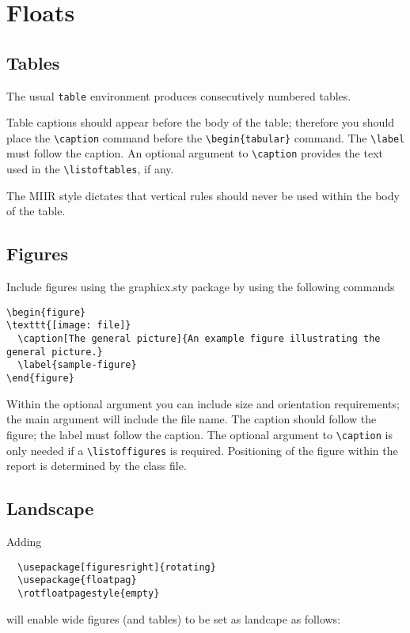 \documentclass{MIIR}
\theoremstyle{plain}
\theoremstyle{definition}
\begin{document}
\section{Floats}
\subsection{Tables}

The usual \verb"table" environment  produces consecutively numbered tables.

Table captions should appear before the body of the table; therefore you
should place the \verb"\caption" command before the \verb"\begin{tabular}" command.
The \verb"\label" must follow the caption. An optional argument to \verb"\caption" provides the text used in the
\verb"\listoftables", if any.

The MIIR style dictates that vertical rules should never be used within the
body of the table. 

\subsection{Figures}

Include figures using the graphicx.sty package
 by using the following commands

 \begin{verbatim}
\begin{figure}
\texttt{[image: file]}
  \caption[The general picture]{An example figure illustrating the general picture.}
  \label{sample-figure}
\end{figure}
\end{verbatim}

Within the optional argument you can include size and orientation requirements; the main argument will include the file name.
The caption should follow the figure; the label must follow the caption. The optional argument to \verb"\caption" is only needed if a \verb"\listoffigures" is required.  Positioning of the figure within the report is determined by the class file.

\subsection{Landscape}
 Adding

 \begin{verbatim}
  \usepackage[figuresright]{rotating}
  \usepackage{floatpag}
  \rotfloatpagestyle{empty}
  \end{verbatim}
%
will enable wide figures (and tables) to be set as landcape as follows: 
\end{document}
